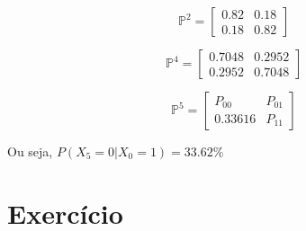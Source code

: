 \documentclass{article}
\begin{document}
\begin{enumerate}[label=(\alph*)]
    $$\mathbb{P}^2=\begin{bmatrix}
        0.82 & 0.18\\
        0.18 & 0.82
    \end{bmatrix}$$
    
    $$\mathbb{P}^4=\begin{bmatrix}
        0.7048 & 0.2952\\
        0.2952 & 0.7048
    \end{bmatrix}$$
    
    $$\mathbb{P}^5=\begin{bmatrix}
        P_{00} & P_{01}\\
        0.33616 & P_{11}
    \end{bmatrix}$$
    
    Ou seja, $P(X_5=0|X_0=1) = 33.62\%$

\end{enumerate}

\section{Exercício}
\end{document}
